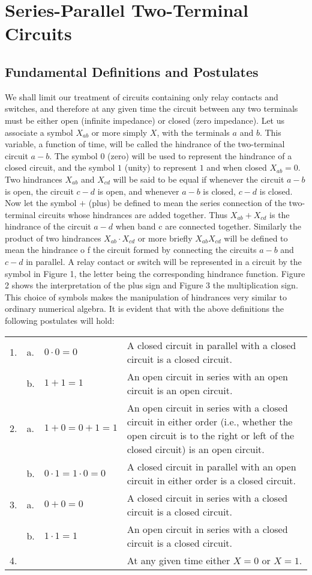 \documentclass[12pt,oneside,letterpaper]{scrbook}
\begin{document}
	\chapter{Series-Parallel Two-Terminal Circuits}
		\section{Fundamental Definitions and Postulates}
		We shall limit our treatment of circuits containing only relay contacts and switches, and therefore at any given time the circuit between any two terminals must be either open (infinite impedance) or closed (zero impedance). Let us associate a symbol $X_{ab}$ or more simply $X$, with the terminals $a$ and $b$. This variable, a function of time, will be called the hindrance of the two-terminal circuit $a -b$. The symbol $0$ (zero) will be used to represent the hindrance of a closed circuit, and the symbol $1$ (unity) to represent $1$ and when closed $X_{ab} = 0$. Two hindrances $X_{ab}$ and $X_{cd}$ will be said to be equal if whenever the circuit $a - b$ is open, the circuit $c - d$ is open, and whenever $a - b$ is closed, $c - d$ is closed. Now let the symbol $+$ (plus) be defined to mean the series connection of the two-terminal circuits whose hindrances are added together. Thus $X_{ab} + X_{cd}$ is the hindrance of the circuit $a - d$ when band c are connected together. Similarly the product of two hindrances $X_{ab} \cdot X_{cd}$ or more briefly $X_{ab} X_{cd}$ will be defined to mean the hindrance o f the circuit formed by connecting the circuits $a - b$ and $c - d$ in parallel. A relay contact or switch will be represented in a circuit by the symbol in Figure 1, the letter being the corresponding hindrance function. Figure 2 shows the interpretation of the plus sign and Figure 3 the multiplication sign. This choice of symbols makes the manipulation of hindrances very similar to ordinary numerical algebra.
		It is evident that with the above definitions the following postulates will hold:
		\begin{center}
			\begin{tabular}{l l l p{4in}}
				1.	& a.& $0 \cdot 0 = 0$ 	& A closed circuit in parallel with a closed circuit is a closed circuit.\\
					& b.& $1 + 1 = 1$		& An open circuit in series with an open circuit is an
					open circuit. \\
				2.	& a.& $1 + 0 = 0 + 1 = 1$ 	& An open circuit in series with a closed circuit in either order (i.e., whether the open circuit is to the right or left of the closed circuit) is an open circuit.\\
					& b.& $0\cdot1 = 1 \cdot 0 = 0$		& A closed circuit in parallel with an open circuit in either order is a closed circuit. \\
				3.	& a.& $0+0=0$ 	& A closed circuit in series with a closed circuit is a closed circuit.\\
					& b.& $1\cdot1=1$		& An open circuit in series with a closed circuit is a closed circuit. \\
				4.	&	&					& At any given time either $X=0$ or $X=1$.
			\end{tabular}
		\end{center}
\end{document}
